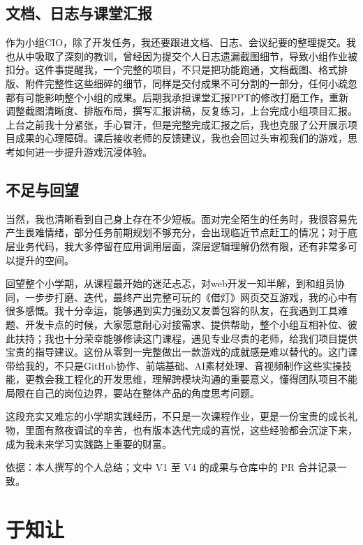 \subsection{文档、日志与课堂汇报}

作为小组CIO，除了开发任务，我还要跟进文档、日志、会议纪要的整理提交。我也从中吸取了深刻的教训，曾经因为提交个人日志遗漏截图细节，导致小组作业被扣分。这件事提醒我，一个完整的项目，不只是把功能跑通，文档截图、格式排版、附件完整性这些细碎的细节，同样是交付成果不可分割的一部分，任何小疏忽都有可能影响整个小组的成果。后期我承担课堂汇报PPT的修改打磨工作，重新调整截图清晰度、排版布局，撰写汇报讲稿，反复练习，上台完成小组项目汇报。上台之前我十分紧张，手心冒汗，但是完整完成汇报之后，我也克服了公开展示项目成果的心理障碍。课后接收老师的反馈建议，我也会回过头审视我们的游戏，思考如何进一步提升游戏沉浸体验。

\subsection{不足与回望}

当然，我也清晰看到自己身上存在不少短板。面对完全陌生的任务时，我很容易先产生畏难情绪，部分任务前期规划不够充分，会出现临近节点赶工的情况；对于底层业务代码，我大多停留在应用调用层面，深层逻辑理解仍然有限，还有非常多可以提升的空间。

回望整个小学期，从课程最开始的迷茫忐忑，对web开发一知半解，到和组员协同，一步步打磨、迭代，最终产出完整可玩的《借灯》网页交互游戏，我的心中有很多感慨。我十分幸运，能够遇到实力强劲又友善包容的队友，在我遇到工具难题、开发卡点的时候，大家愿意耐心对接需求、提供帮助，整个小组互相补位、彼此扶持；我也十分荣幸能够修读这门课程，遇见专业尽责的老师，给我们项目提供宝贵的指导建议。这份从零到一完整做出一款游戏的成就感是难以替代的。这门课带给我的，不只是GitHub协作、前端基础、AI素材处理、音视频制作这些实操技能，更教会我工程化的开发思维，理解跨模块沟通的重要意义，懂得团队项目不能局限在自己的岗位边界，要站在整体产品的角度思考问题。

这段充实又难忘的小学期实践经历，不只是一次课程作业，更是一份宝贵的成长礼物，里面有熬夜调试的辛苦，也有版本迭代完成的喜悦，这些经验都会沉淀下来，成为我未来学习实践路上重要的财富。

\bigskip
{\small\color{black!55} 依据：本人撰写的个人总结；文中 V1 至 V4 的成果与仓库中的 PR 合并记录一致。\par}



\section{于知让}

